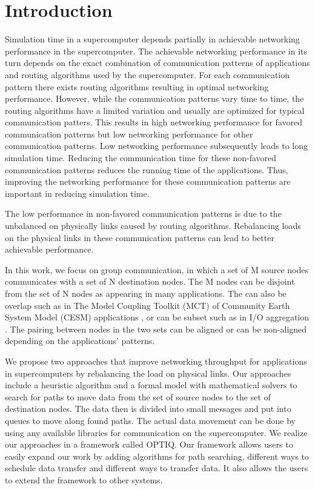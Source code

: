\section{Introduction}
\label{sec:intro}
Simulation time in a supercomputer depends partially in achievable networking performance in the supercomputer. The achievable networking performance in its turn depends on the exact combination of communication patterns of applications and routing algorithms used by the supercomputer. For each communication pattern there exists routing algorithms resulting in optimal networking performance. However, while the communication patterns vary time to time, the routing algorithms have a limited variation and usually are optimized for typical communication patters. This results in high networking performance for favored communication patterns but low networking performance for other communication patterns. Low networking performance subsequently leads to long simulation time. Reducing the communication time for these non-favored communication patterns reduces the running time of the applications. Thus, improving the networking performance for these communication patterns are important in reducing simulation time. 

The low performance in non-favored communication patterns is due to the unbalanced on physically links caused by routing algorithms. Rebalancing loads on the physical links in these communication patterns can lead to better achievable performance. 

In this work, we focus on group communication, in which a set of M source nodes communicates with a set of N destination nodes. The M nodes can be disjoint from the set of N nodes as appearing in many applications. The can also be overlap such as in The Model Coupling Toolkit (MCT) of Community Earth System Model (CESM) applications \cite{MCT:Jacob}, or can be subset such as in I/O aggregation \cite{Vishwanath:GLEAN}. The pairing between nodes in the two sets can be aligned or can be non-aligned depending on the applications' patterns.

We propose two approaches that improve networking throughput for applications in supercomputers by rebalancing the load on physical links. Our approaches include a heuristic algorithm and a formal model with mathematical solvers to search for paths to move data from the set of source nodes to the set of destination nodes. The data then is divided into small messages and put into queues to move along found paths. The actual data movement can be done by using any available libraries for communication on the supercomputer. We realize our approaches in a framework called OPTIQ. Our framework allows users to easily expand our work by adding algorithms for path searching, different ways to schedule data transfer and different ways to transfer data. It also allows the users to extend the framework to other systems.

